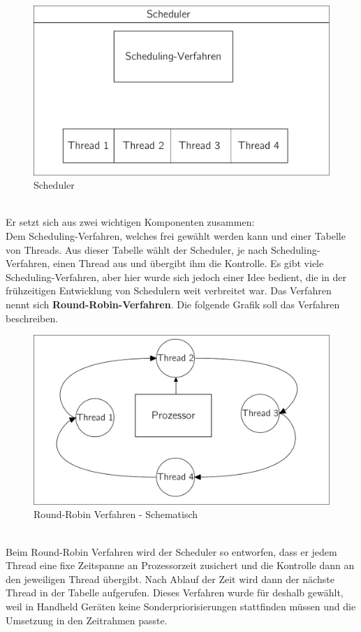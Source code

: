\begin{figure}[h!]
	\centering
	\includegraphics[scale=0.60]{common/draft-scheduler.pdf}	
	\caption{Scheduler}
	\label{draft:draft-scheduler}
\end{figure}\\
Er setzt sich aus zwei wichtigen Komponenten zusammen:\\ Dem Scheduling-Verfahren, welches frei gew\"ahlt werden kann und einer Tabelle von Threads. Aus dieser Tabelle w\"ahlt der Scheduler, je nach Scheduling-Verfahren, einen Thread aus und \"ubergibt ihm die Kontrolle. Es gibt viele Scheduling-Verfahren, aber hier wurde sich jedoch einer Idee bedient, die in der fr\"uhzeitigen Entwicklung von Schedulern weit verbreitet war. 
\newpage\noindent
Das Verfahren nennt sich \textbf{Round-Robin-Verfahren}. Die folgende Grafik soll das Verfahren beschreiben.
\begin{figure}[h!]
	\centering
	\includegraphics[scale=0.60]{common/draft-roundrobin.pdf}	
	\caption{Round-Robin Verfahren - Schematisch}
	\label{draft:draft-roundrobin}
\end{figure}\\
Beim Round-Robin Verfahren wird der Scheduler so entworfen, dass er jedem Thread eine fixe Zeitspanne an Prozessorzeit zusichert und die Kontrolle dann an den jeweiligen Thread \"ubergibt. Nach Ablauf der Zeit wird dann der n\"achste Thread in der Tabelle aufgerufen. Dieses Verfahren wurde f\"ur \mops deshalb gew\"ahlt, weil in Handheld Ger\"aten keine Sonderpriorisierungen stattfinden m\"ussen und die Umsetzung in den Zeitrahmen passte.